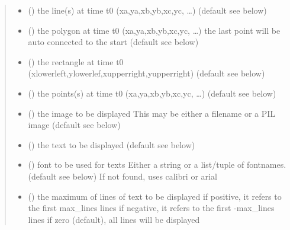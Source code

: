 \documentclass[letterpaper,10pt,english]{sphinxmanual}
\begin{document}
\begin{fulllineitems}
\begin{fulllineitems}
\begin{quote}
\begin{description}
\begin{itemize}
\item {} 
 () \textendash{} the line(s) at time t0 (xa,ya,xb,yb,xc,yc, …) (default see below)

\item {} 
 () \textendash{} the polygon at time t0 (xa,ya,xb,yb,xc,yc, …) 
the last point will be auto connected to the start (default see below)

\item {} 
 () \textendash{} the rectangle at time t0 
(xlowerleft,ylowerlef,xupperright,yupperright) (default see below)

\item {} 
 () \textendash{} the points(s) at time t0 (xa,ya,xb,yb,xc,yc, …) (default see below)

\item {} 
 () \textendash{} the image to be displayed 
This may be either a filename or a PIL image (default see below)

\item {} 
 () \textendash{} the text to be displayed (default see below)

\item {} 
 () \textendash{} font to be used for texts 
Either a string or a list/tuple of fontnames. (default see below)
If not found, uses calibri or arial

\item {} 
 () \textendash{} the maximum of lines of text to be displayed 
if positive, it refers to the first max\_lines lines 
if negative, it refers to the first -max\_lines lines 
if zero (default), all lines will be displayed


\end{itemize}
\end{description}
\end{quote}
\end{fulllineitems}
\end{fulllineitems}
\end{document}
